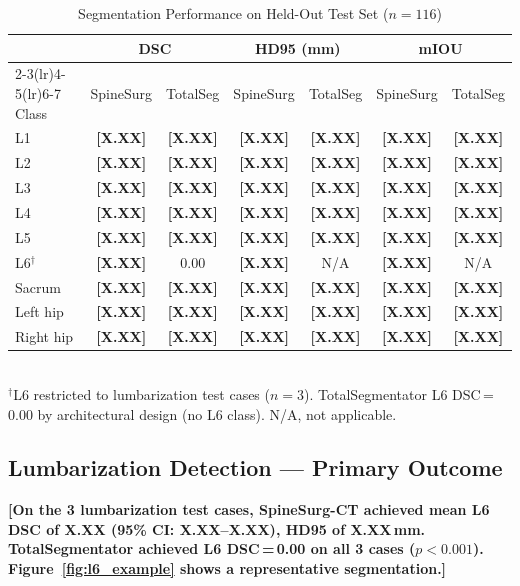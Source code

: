 \documentclass{article}
\newcommand{\ph}[1]{\textcolor{placeholder}{\textbf{[#1]}}}
\begin{document}
\begin{table}[ht]
\centering
\caption{Segmentation Performance on Held-Out Test Set ($n{=}116$)}
\label{tab:segmentation}
\begin{tabular}{lcccccc}
\toprule
 & \multicolumn{2}{c}{DSC} & \multicolumn{2}{c}{HD95 (mm)}
 & \multicolumn{2}{c}{mIOU} \\
\cmidrule(lr){2-3}\cmidrule(lr){4-5}\cmidrule(lr){6-7}
Class & SpineSurg & TotalSeg & SpineSurg & TotalSeg
      & SpineSurg & TotalSeg \\
\midrule
L1           & \ph{X.XX} & \ph{X.XX} & \ph{X.XX} & \ph{X.XX} & \ph{X.XX} & \ph{X.XX} \\
L2           & \ph{X.XX} & \ph{X.XX} & \ph{X.XX} & \ph{X.XX} & \ph{X.XX} & \ph{X.XX} \\
L3           & \ph{X.XX} & \ph{X.XX} & \ph{X.XX} & \ph{X.XX} & \ph{X.XX} & \ph{X.XX} \\
L4           & \ph{X.XX} & \ph{X.XX} & \ph{X.XX} & \ph{X.XX} & \ph{X.XX} & \ph{X.XX} \\
L5           & \ph{X.XX} & \ph{X.XX} & \ph{X.XX} & \ph{X.XX} & \ph{X.XX} & \ph{X.XX} \\
L6$^\dagger$ & \ph{X.XX} & 0.00      & \ph{X.XX} & N/A       & \ph{X.XX} & N/A       \\
Sacrum       & \ph{X.XX} & \ph{X.XX} & \ph{X.XX} & \ph{X.XX} & \ph{X.XX} & \ph{X.XX} \\
Left hip     & \ph{X.XX} & \ph{X.XX} & \ph{X.XX} & \ph{X.XX} & \ph{X.XX} & \ph{X.XX} \\
Right hip    & \ph{X.XX} & \ph{X.XX} & \ph{X.XX} & \ph{X.XX} & \ph{X.XX} & \ph{X.XX} \\
\bottomrule
\end{tabular}\\[2pt]
\footnotesize{$^\dagger$L6 restricted to lumbarization test cases ($n{=}3$).
TotalSegmentator L6 DSC\,=\,0.00 by architectural design (no L6 class).
N/A, not applicable.}
\end{table}

\subsection{Lumbarization Detection --- Primary Outcome}

\ph{On the 3 lumbarization test cases, SpineSurg-CT achieved mean L6 DSC of
X.XX (95\% CI: X.XX--X.XX), HD95 of X.XX\,mm. TotalSegmentator achieved L6
DSC\,=\,0.00 on all 3 cases ($p{<}0.001$).
Figure~\ref{fig:l6_example} shows a representative segmentation.}
\end{document}
